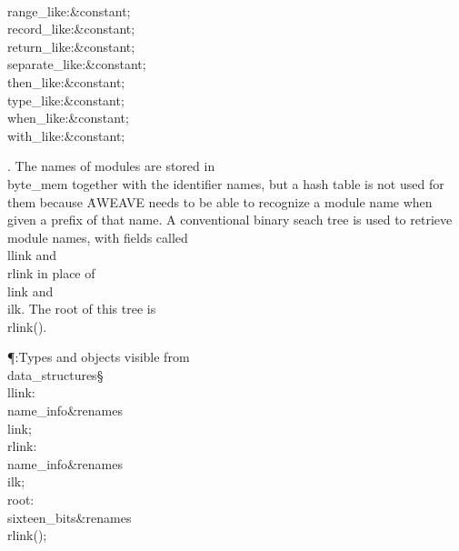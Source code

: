 \\{range\_like}\?:\?\&{constant}\8\?\K{};\6
\\{record\_like}\?:\?\&{constant}\8\?\K{};\6
\\{return\_like}\?:\?\&{constant}\8\?\K{};%
\6
\\{separate\_like}\?:\?\&{constant}\8\?\K{};\6
\\{then\_like}\?:\?\&{constant}\8\?\K{};\6
\\{type\_like}\?:\?\&{constant}\8\?\K{};\6
\\{when\_like}\?:\?\&{constant}\8\?\K{};\6
\\{with\_like}\?:\?\&{constant}\8\?\K{};\par
\fi

. The names of modules are stored in \\{byte\_mem} together
with the identifier names, but a hash table is not used for them because
\.{AWEAVE} needs to be able to recognize a module name when given a prefix of
that name. A conventional binary seach tree is used to retrieve module names,
with fields called \\{llink} and \\{rlink} in place of \\{link} and \\{ilk}.
The
root of this tree is \\{rlink}\?(\?)\?.

\Y\P\?\4:Types and objects visible from \\{data\_structures}\X\mathrel{+}\S%
\?\6
\\{llink}\?:\?\\{name\_info}\8\&{renames}\8\\{link};\6
\\{rlink}\?:\?\\{name\_info}\8\&{renames}\8\\{ilk};\6
\\{root}\?:\?\\{sixteen\_bits}\8\&{renames}\8\\{rlink}\?\1(\?\2)\?;\par
\fi


